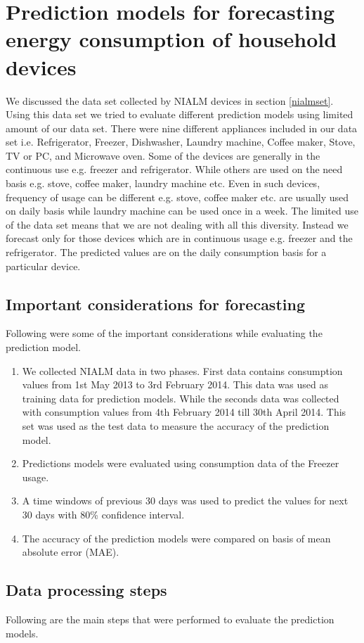 \section{Prediction models for forecasting energy consumption of household devices}
We discussed the data set collected by NIALM devices in section \ref{nialmset}. Using this data set we tried to evaluate different prediction models using limited amount of our data set. There were nine different appliances included in our data set i.e. Refrigerator, Freezer, Dishwasher, Laundry machine, Coffee maker, Stove, TV or PC, and Microwave oven. Some of the devices are generally in the continuous use e.g. freezer and refrigerator. While others are used on the need basis e.g. stove, coffee maker, laundry machine etc. Even in such devices, frequency of usage can be different e.g. stove, coffee maker etc. are usually used on daily basis while laundry machine can be used once in a week. The limited use of the data set means that we are not dealing with all this diversity. Instead we forecast only for those devices which are in continuous usage e.g. freezer and the refrigerator. The predicted values are on the daily consumption basis for a particular device.  
\subsection{Important considerations for forecasting}
Following were some of the important considerations while evaluating the prediction model.
\begin{enumerate}
\item We collected NIALM data in two phases. First data contains consumption values from 1st May 2013 to 3rd February 2014. This data was used as training data for prediction models. While the seconds data was collected with consumption values from 4th February 2014 till 30th April 2014. This set was used as the test data to measure the accuracy of the prediction model.
\item Predictions models were evaluated using consumption data of the Freezer usage.
\item A time windows of previous 30 days was used to predict the values for next 30 days with 80\% confidence interval.
\item  The accuracy of the prediction models were compared on basis of mean absolute error (MAE).
\end{enumerate}     

\subsection{Data processing steps}
Following are the main steps that were performed to evaluate the prediction models.

